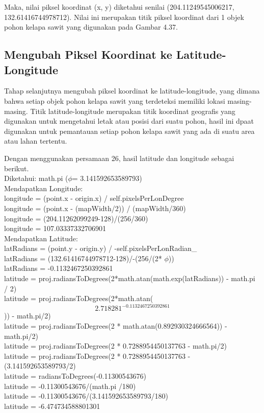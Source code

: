 Maka, nilai piksel koordinat (x, y) diketahui senilai (204.11249545006217, 132.61416744978712). Nilai ini merupakan titik piksel koordinat dari 1 objek pohon kelapa sawit yang digunakan pada Gambar 4.37.

\subsection{Mengubah Piksel Koordinat ke Latitude-Longitude}
\hspace{1,2cm}
Tahap selanjutnya mengubah piksel koordinat ke latitude-longitude, yang dimana bahwa setiap objek pohon kelapa sawit yang terdeteksi memiliki lokasi masing-masing. Titik latitude-longitude merupakan titik koordinat geografis yang digunakan untuk mengetahui letak atau posisi dari suatu pohon, hasil ini dpaat digunakan untuk pemantauan setiap pohon kelapa sawit yang ada di suatu area atau lahan tertentu.

Dengan menggunakan persamaan 26, hasil latitude dan longitude sebagai berikut.\\
Diketahui: math.pi ($\phi$= 3.141592653589793)\\
Mendapatkan Longitude:\\
longitude = (point.x - origin.x) / self.pixelsPerLonDegree\textunderscore \\
longitude = (point.x - (mapWidth/2)) / (mapWidth/360)\\
longitude = (204.11262099249-128)/(256/360)\\
longitude = 107.03337332706901\\
Mendapatkan Latitude: \\
latRadians = (point.y - origin.y) / -self.pixelsPerLonRadian\_ \\
latRadians = (132.61416744978712-128)/-(256/(2* $\phi$))\\
latRadians = -0.1132467250392861\\
latitude = proj.radiansToDegrees(2*math.atan(math.exp(latRadians)) - math.pi / 2)\\
latitude = proj.radiansToDegrees(2*math.atan(\[2.718281^{-0.1132467250392861}\])) - math.pi/2)\\
latitude = proj.radiansToDegrees(2 * math.atan(0.892930324666564)) - math.pi/2)\\
latitude = proj.radiansToDegrees(2 * 0.7288954450137763 - math.pi/2)\\
latitude = proj.radiansToDegrees(2 * 0.7288954450137763 - (3.141592653589793/2)\\
latitude = radiansToDegrees(-0.11300543676)\\
latitude = -0.11300543676/(math.pi /180)\\
latitude = -0.11300543676/(3.141592653589793/180)\\
latitude = -6.474734588801301

